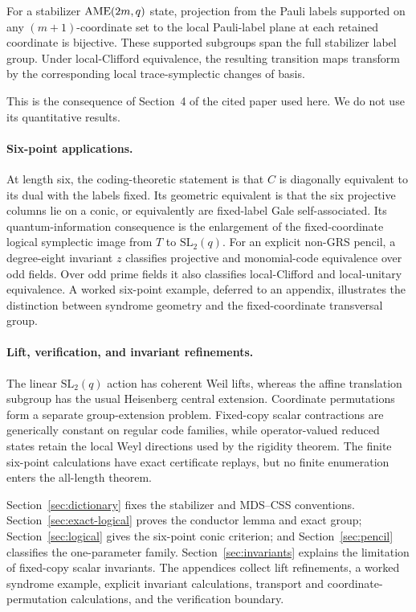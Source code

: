 \begin{theorem}
\label{thm:minimum-support-transitions}
For a stabilizer \(\mathrm{AME}(2m,q)\) state, projection from the Pauli labels
supported on any \((m+1)\)-coordinate set to the local Pauli-label plane at
each retained coordinate is bijective.  These supported subgroups span the
full stabilizer label group.  Under local-Clifford equivalence, the resulting
transition maps transform by the corresponding local trace-symplectic changes
of basis.
\end{theorem}

This is the consequence of Section~4 of the cited paper used here.  We do not
use its quantitative results.

\paragraph{Six-point applications.}
At length six, the coding-theoretic statement is that
\(C\) is diagonally equivalent to its dual with the labels fixed.  Its
geometric equivalent is that the six
projective columns lie on a conic, or equivalently are fixed-label Gale
self-associated.  Its quantum-information consequence is the enlargement of
the fixed-coordinate logical symplectic image from \(T\) to
\(\mathrm{SL}_2(q)\).  For an explicit non-GRS pencil, a degree-eight
invariant \(z\) classifies projective and monomial-code equivalence over odd
fields.  Over odd prime fields it also classifies local-Clifford and
local-unitary equivalence.  A worked six-point example, deferred to an
appendix, illustrates the distinction between syndrome geometry and the
fixed-coordinate transversal group.

\paragraph{Lift, verification, and invariant refinements.}
The linear \(\mathrm{SL}_2(q)\) action has coherent Weil lifts, whereas the
affine translation subgroup has the usual Heisenberg central extension.
Coordinate permutations form a separate group-extension problem.  Fixed-copy
scalar contractions are generically constant on regular code families, while
operator-valued reduced states retain the local Weyl directions used by the
rigidity theorem.  The finite six-point calculations have exact certificate
replays, but no finite enumeration enters the all-length theorem.

Section~\ref{sec:dictionary} fixes the stabilizer and MDS--CSS conventions.
Section~\ref{sec:exact-logical} proves the conductor lemma and exact group;
Section~\ref{sec:logical} gives the six-point conic criterion; and
Section~\ref{sec:pencil} classifies the one-parameter family.
Section~\ref{sec:invariants} explains the limitation of fixed-copy scalar
invariants.  The appendices collect lift refinements, a worked syndrome
example, explicit invariant calculations, transport and coordinate-permutation
calculations, and the verification boundary.
